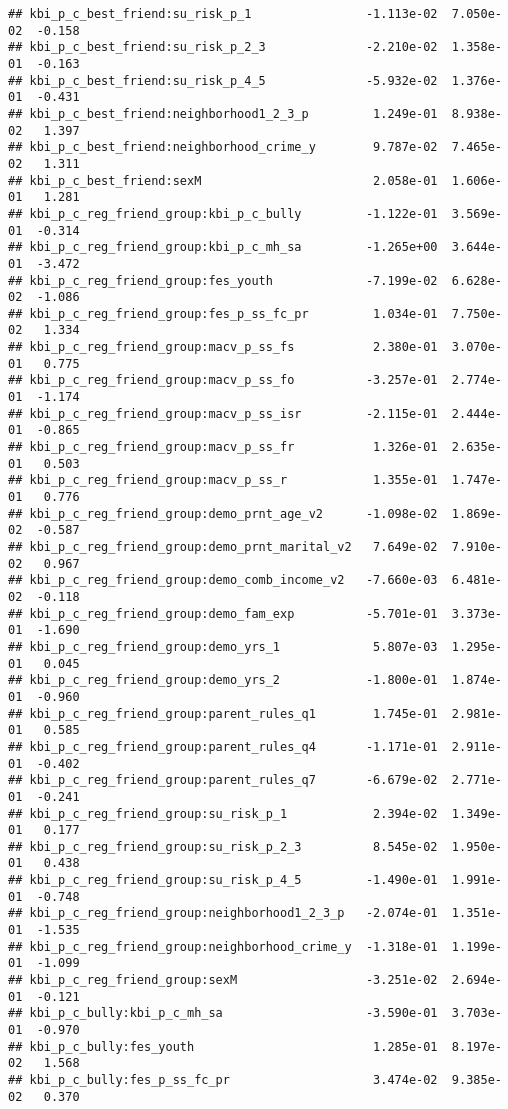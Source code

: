\documentclass[
]{article}
\begin{document}
\begin{verbatim}
## kbi_p_c_best_friend:su_risk_p_1                -1.113e-02  7.050e-02  -0.158
## kbi_p_c_best_friend:su_risk_p_2_3              -2.210e-02  1.358e-01  -0.163
## kbi_p_c_best_friend:su_risk_p_4_5              -5.932e-02  1.376e-01  -0.431
## kbi_p_c_best_friend:neighborhood1_2_3_p         1.249e-01  8.938e-02   1.397
## kbi_p_c_best_friend:neighborhood_crime_y        9.787e-02  7.465e-02   1.311
## kbi_p_c_best_friend:sexM                        2.058e-01  1.606e-01   1.281
## kbi_p_c_reg_friend_group:kbi_p_c_bully         -1.122e-01  3.569e-01  -0.314
## kbi_p_c_reg_friend_group:kbi_p_c_mh_sa         -1.265e+00  3.644e-01  -3.472
## kbi_p_c_reg_friend_group:fes_youth             -7.199e-02  6.628e-02  -1.086
## kbi_p_c_reg_friend_group:fes_p_ss_fc_pr         1.034e-01  7.750e-02   1.334
## kbi_p_c_reg_friend_group:macv_p_ss_fs           2.380e-01  3.070e-01   0.775
## kbi_p_c_reg_friend_group:macv_p_ss_fo          -3.257e-01  2.774e-01  -1.174
## kbi_p_c_reg_friend_group:macv_p_ss_isr         -2.115e-01  2.444e-01  -0.865
## kbi_p_c_reg_friend_group:macv_p_ss_fr           1.326e-01  2.635e-01   0.503
## kbi_p_c_reg_friend_group:macv_p_ss_r            1.355e-01  1.747e-01   0.776
## kbi_p_c_reg_friend_group:demo_prnt_age_v2      -1.098e-02  1.869e-02  -0.587
## kbi_p_c_reg_friend_group:demo_prnt_marital_v2   7.649e-02  7.910e-02   0.967
## kbi_p_c_reg_friend_group:demo_comb_income_v2   -7.660e-03  6.481e-02  -0.118
## kbi_p_c_reg_friend_group:demo_fam_exp          -5.701e-01  3.373e-01  -1.690
## kbi_p_c_reg_friend_group:demo_yrs_1             5.807e-03  1.295e-01   0.045
## kbi_p_c_reg_friend_group:demo_yrs_2            -1.800e-01  1.874e-01  -0.960
## kbi_p_c_reg_friend_group:parent_rules_q1        1.745e-01  2.981e-01   0.585
## kbi_p_c_reg_friend_group:parent_rules_q4       -1.171e-01  2.911e-01  -0.402
## kbi_p_c_reg_friend_group:parent_rules_q7       -6.679e-02  2.771e-01  -0.241
## kbi_p_c_reg_friend_group:su_risk_p_1            2.394e-02  1.349e-01   0.177
## kbi_p_c_reg_friend_group:su_risk_p_2_3          8.545e-02  1.950e-01   0.438
## kbi_p_c_reg_friend_group:su_risk_p_4_5         -1.490e-01  1.991e-01  -0.748
## kbi_p_c_reg_friend_group:neighborhood1_2_3_p   -2.074e-01  1.351e-01  -1.535
## kbi_p_c_reg_friend_group:neighborhood_crime_y  -1.318e-01  1.199e-01  -1.099
## kbi_p_c_reg_friend_group:sexM                  -3.251e-02  2.694e-01  -0.121
## kbi_p_c_bully:kbi_p_c_mh_sa                    -3.590e-01  3.703e-01  -0.970
## kbi_p_c_bully:fes_youth                         1.285e-01  8.197e-02   1.568
## kbi_p_c_bully:fes_p_ss_fc_pr                    3.474e-02  9.385e-02   0.370

\end{verbatim}
\end{document}
